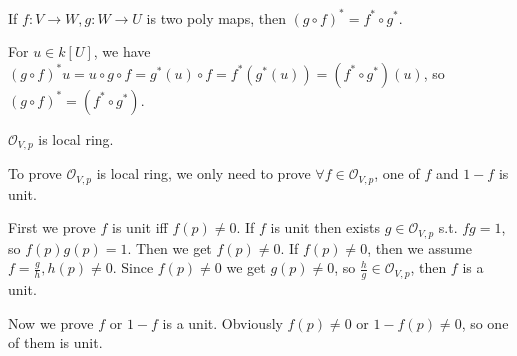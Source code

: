 \documentclass{ctexart}
\newif\ifpreface
\begin{document}
\large
\setlength{\baselineskip}{1.2em}
\ifpreface
    
\newgeometry{left=2cm,right=2cm,top=2cm,bottom=2cm}
\else
{}
\maketitle
\fi
\begin{problem}
 If $f:V\to W,g:W\to U$ is two poly maps, then $(g\circ f)^*=f^*\circ g^*$. 
\end{problem}

\begin{solution}
 For $u\in k[U]$, we have $(g\circ f)^* u=u\circ g\circ f=g^*(u)\circ f=f^*(g^*(u))=(f^*\circ g^*)(u)$, so $(g\circ f)^*=(f^*\circ g^*)$. 
\end{solution}

\begin{problem}
 $\mathcal{O}_{V,p}$ is local ring. 
\end{problem}

\begin{solution}
 To prove $\mathcal{O}_{V,p}$ is local ring, we only need to prove $\forall f\in \mathcal{O}_{V,p}$, one of $f$ and $1-f$ is unit. 

 First we prove $f$ is unit iff $f(p)\neq 0$. If $f$ is unit then exists $g\in \mathcal{O}_{V,p}$ s.t. $fg=1$, so $f(p)g(p)=1$. Then we get $f(p)\neq 0$. If $f(p)\neq 0$, then we assume $f=\frac{g}{h},h(p)\neq 0$. Since $f(p)\neq 0$ we get $g(p)\neq 0$, so $\frac{h}{g}\in \mathcal{O}_{V,p}$, then $f$ is a unit. 

 Now we prove $f$ or $1-f$ is a unit. Obviously $f(p)\neq 0$ or $1-f(p)\neq 0$, so one of them is unit. 
\end{solution}
\end{document}
